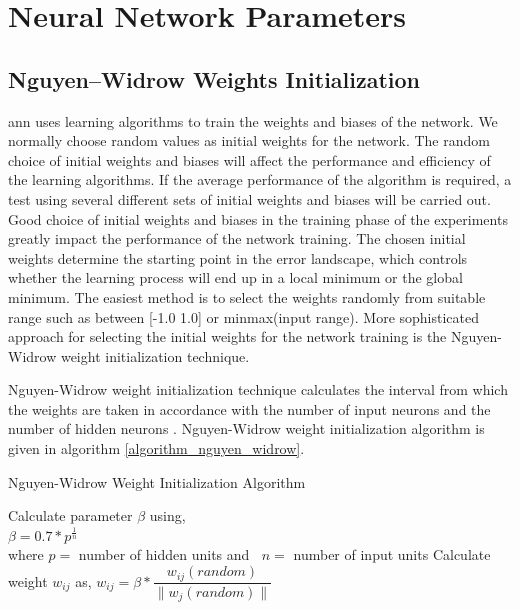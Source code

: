 \chapter{Neural Network Parameters}
\section{Nguyen–Widrow Weights Initialization} \label{algorithm_appendix_nguyen_widrow_weight_initialization}

\acs{ann} uses learning algorithms to train the weights and biases of the network. We normally choose random values as initial weights for the network. The random choice of initial weights and biases will affect the performance and efficiency of the learning algorithms. If the average performance of the algorithm is required, a test using several different sets of initial weights and biases will be carried out. Good choice of initial weights and biases in the training phase of the experiments greatly impact the performance of the network training. The chosen initial weights determine the starting point in the error landscape, which controls whether the learning process will end up in a local minimum or the global minimum. The easiest method is to select the weights randomly from suitable range such as between [-1.0 1.0] or minmax(input range). More sophisticated approach for selecting the initial weights for the network training is the Nguyen-Widrow weight initialization technique. \par
Nguyen-Widrow weight initialization technique calculates the interval from which the weights are taken in accordance with the number of input neurons and the number of hidden neurons \cite{Nguyen1990}. Nguyen-Widrow weight initialization algorithm is given in algorithm \ref{algorithm_nguyen_widrow}.

\begin{algorithm}
\caption{Nguyen-Widrow Weight Initialization Algorithm}
\label{algorithm_nguyen_widrow}
\begin{algorithmic}[1]
\STATE Calculate parameter $\beta$ using,\\
\STATE\qquad$\beta=0.7*p^{\frac{1}{n}}$\\
\STATE\qquad\qquad where $p=$ number of hidden units and
\STATE\qquad\qquad\qquad $\;\;n=$ number of input units
\STATE Calculate weight $w_{ij}$ as,
\STATE\qquad $w_{ij}=\beta*\dfrac{w_{ij}(random)}{\lVert w_j(random)\rVert}$
\end{algorithmic}
\end{algorithm}

